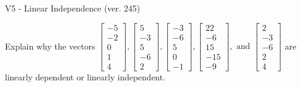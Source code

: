 \begin{exercise}
  \begin{exerciseTitle}V5 - Linear Independence (ver. 245)\end{exerciseTitle}
  \begin{exerciseStatement}
    Explain why the vectors \(\left[\begin{array}{r}
-5 \\
-2 \\
0 \\
1 \\
4
\end{array}\right] , \left[\begin{array}{r}
5 \\
-3 \\
5 \\
-6 \\
2
\end{array}\right] , \left[\begin{array}{r}
-3 \\
-6 \\
5 \\
0 \\
-1
\end{array}\right] , \left[\begin{array}{r}
22 \\
-6 \\
15 \\
-15 \\
-9
\end{array}\right] , \text{ and } \left[\begin{array}{r}
2 \\
-3 \\
-6 \\
2 \\
4
\end{array}\right]\) are linearly dependent or linearly independent.	



\end{exerciseStatement}
\end{exercise}
